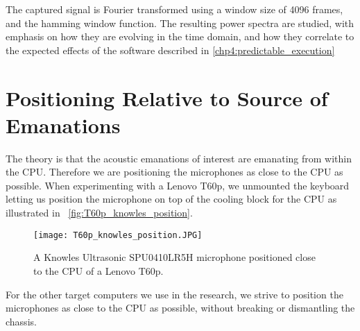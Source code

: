 The captured signal is Fourier transformed using a window size of 4096 frames, and the hamming window function. The resulting power spectra are studied, with emphasis on how they are evolving in the time domain, and how they correlate to the expected effects of the software described in \autoref{chp4:predictable_execution}

\section{Positioning Relative to Source of Emanations}\label{chp3:sec:capturing_audio_fingerprint}
The theory is that the acoustic emanations of interest are emanating from within the CPU.
Therefore we are positioning the microphones as close to the CPU as possible. 
When experimenting with a Lenovo T60p, we unmounted the keyboard letting us position the microphone on top of the cooling block for the CPU as illustrated in ~\autoref{fig:T60p_knowles_position}. 

\begin{figure}[ht]
  \centering
  \texttt{[image: T60p\_knowles\_position.JPG]}
  \caption{A Knowles Ultrasonic SPU0410LR5H microphone positioned close to the CPU of a Lenovo T60p.}
  \label{fig:T60p_knowles_position}
\end{figure}

For the other target computers we use in the research, we strive to position the microphones as close to the CPU as possible, without breaking or dismantling the chassis.
